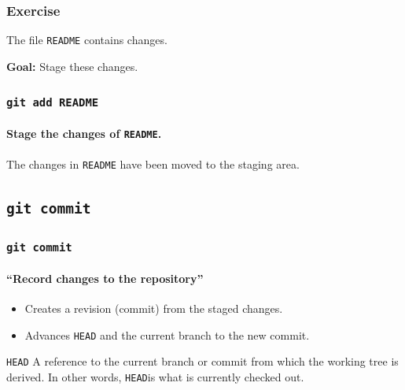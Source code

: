 \documentclass{beamer}
\newcommand\gitcmd[1]{\texttt{git #1}}
\newcommand\gHEAD{\texttt{HEAD}}
\newcommand\goal[1]{\textbf{Goal:} #1}
\begin{document}
\begin{frame}
  \frametitle{Exercise}
  The file \texttt{README} contains changes.

  \goal{Stage these changes.}

  \begin{figure}
    \centering
  \end{figure}
\end{frame}

\begin{frame}
  \frametitle{\gitcmd{add README}}
  \framesubtitle{Stage the changes of \texttt{README}.}
  \begin{figure}
    \centering
  \end{figure}
  The changes in \texttt{README} have been moved to the staging area.
\end{frame}

\subsection{\gitcmd{commit}}

\begin{frame}
  \frametitle{\gitcmd{commit}}
  \framesubtitle{``Record changes to the repository''}
  \begin{itemize}
    \item Creates a revision (commit) from the staged changes.
    \item Advances \gHEAD{} and the current branch to the new commit.
  \end{itemize}
  \vfill
  \begin{block}{\gHEAD{}}
    A reference to the current branch or commit from which the working tree is derived. In other words, \gHEAD is what is currently checked out.
  \end{block}
\end{frame}
\end{document}
